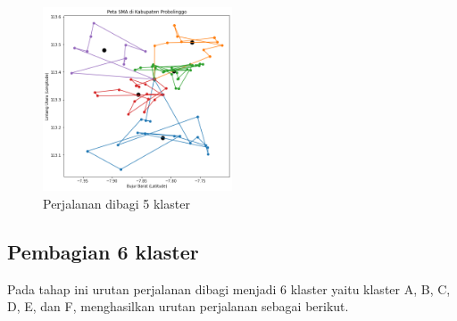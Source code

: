 \begin{figure}[H]
\centering
\includegraphics[width=0.5\textwidth]{Gambar/hasil_mtsp/5}
\caption{Perjalanan dibagi 5 klaster}
\label{fig:hasil_mtsp5}
\end{figure}

\subsection{Pembagian 6 klaster}

Pada tahap ini urutan perjalanan dibagi menjadi 6 klaster yaitu klaster A, B, C, D, E, dan F, menghasilkan urutan perjalanan sebagai berikut.

